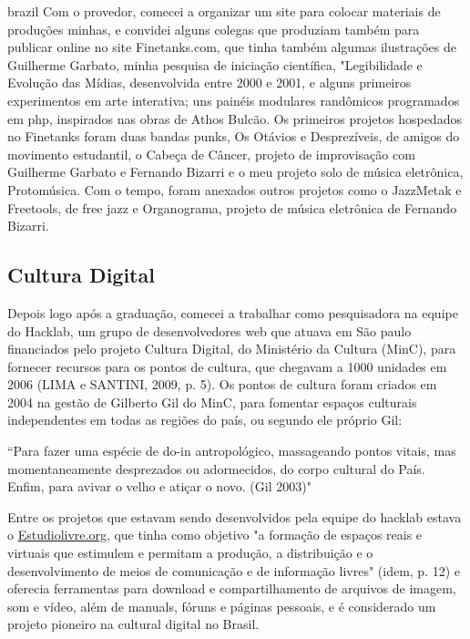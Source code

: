 \begin{otherlanguage*}{brazil}
Com o provedor, comecei a organizar um site para colocar materiais de produções minhas, e convidei alguns colegas que produziam também para publicar online no site Finetanks.com, que tinha também algumas ilustrações de Guilherme Garbato, minha pesquisa de iniciação científica, "Legibilidade e Evolução das Mídias, desenvolvida entre 2000 e 2001, e alguns primeiros experimentos em arte interativa; uns painéis modulares randômicos programados em php, inspirados nas obras de Athos Bulcão.  
Os primeiros projetos hospedados no Finetanks foram duas bandas punks, Os Otávios e Desprezíveis, de amigos do movimento estudantil, o Cabeça de Câncer, projeto de improvisação com Guilherme Garbato e Fernando Bizarri e o meu projeto solo de música eletrônica, Protomúsica. Com o tempo, foram anexados outros projetos como o JazzMetak e Freetools, de free jazz e Organograma, projeto de música eletrônica de Fernando Bizarri.

\subsection{Cultura Digital}

Depois logo após a graduação, comecei a trabalhar como pesquisadora na equipe do Hacklab, um grupo de desenvolvedores web que atuava em São paulo financiados pelo projeto Cultura Digital, do Ministério da Cultura (MinC), para fornecer recursos para os pontos de cultura, que chegavam a 1000 unidades em 2006 (LIMA e SANTINI, 2009, p. 5). Os pontos de cultura foram criados em 2004 na gestão de Gilberto Gil do MinC, para fomentar espaços culturais independentes em todas as regiões do país, ou segundo ele próprio Gil:
\begin{citacao}

``Para fazer uma espécie de do-in antropológico, massageando pontos vitais, mas momentaneamente desprezados ou adormecidos, do corpo cultural do País. Enfim, para avivar o velho e atiçar o novo. (Gil 2003)" 
\end{citacao}


Entre os projetos que estavam sendo desenvolvidos pela equipe do hacklab estava o \url{Estudiolivre.org}, que tinha como objetivo "a formação de espaços reais e virtuais que estimulem e permitam a produção, a distribuição e o desenvolvimento de meios de comunicação e de informação livres" (idem, p. 12) e oferecia ferramentas para download e compartilhamento de arquivos de imagem, som e vídeo, além de manuals, fóruns e páginas pessoais, e é considerado um projeto pioneiro na cultural digital no Brasil. 


\end{otherlanguage*}
